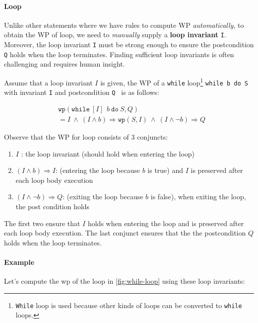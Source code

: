 \documentclass[oneside,11pt,dvipsnames]{book}
\renewcommand{\implies}{\Rightarrow}
\newcommand{\code}[1]{\texttt{#1}}
\begin{document}
\paragraph{Loop}

Unlike other statements where we have rules to compute WP \emph{automatically}, to obtain the WP of loop, we need to \emph{manually} supply a \textbf{loop invariant}
\code{I}. Moreover, the loop invariant \code{I} must be strong enough to ensure the postcondition \code{Q} holds when the loop terminates. Finding sufficient loop invariants is often challenging and requires human insight.

Assume that a loop invariant $I$ is given, the WP of a \code{while} loop\footnote{\code{While} loop is used because other kinds of loops can be converted to \code{while} loops.} \code{while b do S} with invariant \code{I} and postcondition \code{Q
} is as follows:

\begin{equation}
    \begin{split}
    & \code{wp}(\code{while} ~[I]~ ~b~ \code{do} ~S, Q) \\
    &=    I  ~\land~   (I \land b) \implies \code{wp}(S,I)  ~\land~ (I \land \neg b)  \implies Q
    \end{split}   
\end{equation}

Observe that the WP for loop consists of 3 conjuncts:
\begin{enumerate}
\item $I$ : the loop invariant (should hold when entering the loop)
\item $(I \land b) \implies I$: (entering the loop because $b$ is true) and $I$ is preserved after each loop body execution
\item $(I \land \neg b) \implies Q$: (exiting the loop because $b$ is false), when exiting the loop, the post condition holds
\end{enumerate}

The first two ensure that $I$ holds when entering the loop and is preserved after each loop body execution. The last conjunct ensures that the the postcondition $Q$ holds when the loop terminates.

\paragraph{Example}


Let's compute the wp of the loop in \autoref{fig:while-loop} using these loop invariants: 
\end{document}
